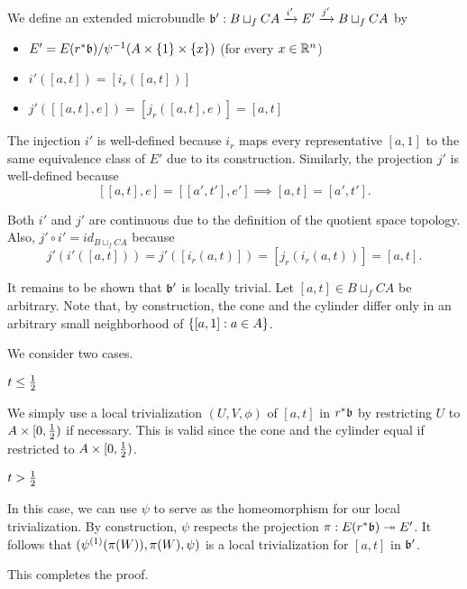 \begin{myproof}
    We define an extended microbundle $\bundledef{\bb'}{B \sqcup_f CA}{E'}{i'}{j'}$ by
    \begin{itemize}
        \item $E' = E(\ind{r}\bb) / \inv{\psi}(A \cross \{1\} \cross \{x\})$ (for every $x \in \mathbb{R}^n$)
        \item $i'([a, t]) = [i_r([a, t])]$
        \item $j'([[a, t], e]) = [j_r([a, t], e)] = [a, t]$
    \end{itemize}
    The injection $i'$ is well-defined because $i_r$ maps every
    representative $[a, 1]$ to the same equivalence
    class of $E'$ due to its construction.
    Similarly, the projection $j'$ is well-defined because
    \[ [[a, t], e] = [[a', t'], e'] \implies  [a, t] = [a', t']. \]

    Both $i'$ and $j'$ are continuous
    due to the definition of the quotient space topology.
    Also, $j' \circ i' = id_{B \sqcup_f CA}$ because
    \[ j'(i'([a, t])) = j'([i_r(a, t)]) = [j_r(i_r(a, t))] = [a, t]. \]

    It remains to be shown that $\bb'$ is locally trivial.
    Let $[a, t] \in B \sqcup_f CA$ be arbitrary.
    Note that, by construction,
    the cone and the cylinder differ only
    in an arbitrary small neighborhood of $\{[a, 1]:a \in A\}$.

    We consider two cases.
    \begin{caselist}
        \item $t \le \frac{1}{2}$

        We simply use a local trivialization $(U, V, \phi)$ of $[a, t]$ in $\ind{r}\bb$
        by restricting $U$ to $A \times [0, \frac{1}{2})$ if necessary.
        This is valid since the cone and the cylinder equal if restricted to $A \times [0, \frac{1}{2})$.

        \item $t > \frac{1}{2}$
        
        In this case, we can use $\psi$ to serve as the homeomorphism for our local trivialization.
        By construction, $\psi$ respects the projection $\pi: E(\ind{r}\bb) \subm E'$.
        It follows that $(\psi^{(1)}(\pi(W)), \pi(W), \psi)$
        is a local trivialization for $[a, t]$ in $\bb'$.
    \end{caselist}
    This completes the proof.
\end{myproof}